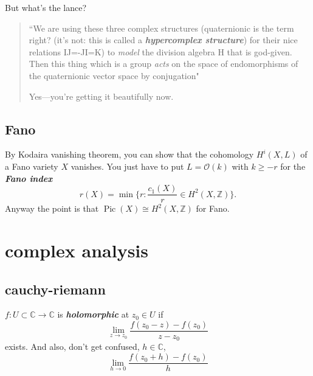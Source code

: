 But what's the lance?
\begin{quotation}
	``We are using these three complex structures (quaternionic is the term right? (it's not: this is called a \textit{\textbf{hypercomplex structure}}) for their nice relations IJ=-JI=K) to \textit{model} the division algebra H that is god-given. Then this thing which is a group \textit{acts} on the space of endomorphisms of the quaternionic vector space by conjugation"

	\vspace{1em}
	\hfill Yes---you're getting it beautifully now.
\end{quotation}


\subsection{Fano}

\begin{exercise}\leavevmode
By Kodaira vanishing theorem, you can show that the cohomology \(H^{i}(X,L)\) of a Fano variety \(X\) vanishes. You just have to put \(L=\mathcal{O}(k)\) with \(k\geq  -r\) for the \textit{\textbf{Fano index}} 
\[r(X)=\operatorname{min}\{r:\frac{c_1(X)}{r}\in H^{2}(X,\mathbb{Z})\}.\]
Anyway the point is that \(\operatorname{Pic}(X)\cong H^{2}(X,\mathbb{Z})\) for Fano.
\end{exercise}

\section{complex analysis}

\subsection{cauchy-riemann}

\(f:U \subset \mathbb{C} \to \mathbb{C}\) is \textit{\textbf{holomorphic}} at \(z_0\in U\) if
\[\lim_{z \to z_0} \frac{f(z_0-z)-f(z_0)}{z-z_0}\]
exists. And also, don't get confused, \(h\in \mathbb{C}\),
\[\lim_{h \to 0} \frac{f(z_0+h)-f(z_0)}{h}\]

